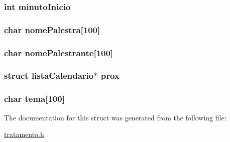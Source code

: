 \subsubsection[{minuto\+Inicio}]{\setlength{\rightskip}{0pt plus 5cm}int minuto\+Inicio}\label{structlista_calendario_a12abfd10f7bc791e8ec4f457078271c6}
\hypertarget{structlista_calendario_adc5cb057e15c10f55e77627c34ca1442}{}
\subsubsection[{nome\+Palestra}]{\setlength{\rightskip}{0pt plus 5cm}char nome\+Palestra\mbox{[}100\mbox{]}}\label{structlista_calendario_adc5cb057e15c10f55e77627c34ca1442}
\hypertarget{structlista_calendario_af31dd10e6cbda382c5fcb72a1d7e34ff}{}
\subsubsection[{nome\+Palestrante}]{\setlength{\rightskip}{0pt plus 5cm}char nome\+Palestrante\mbox{[}100\mbox{]}}\label{structlista_calendario_af31dd10e6cbda382c5fcb72a1d7e34ff}
\hypertarget{structlista_calendario_a1baa22779e03a190ac11515e1d0e7964}{}
\subsubsection[{prox}]{\setlength{\rightskip}{0pt plus 5cm}struct {\bf lista\+Calendario}$\ast$ prox}\label{structlista_calendario_a1baa22779e03a190ac11515e1d0e7964}
\hypertarget{structlista_calendario_a016fbc0f5fcc04c86b0e98087a05de7e}{}
\subsubsection[{tema}]{\setlength{\rightskip}{0pt plus 5cm}char tema\mbox{[}100\mbox{]}}\label{structlista_calendario_a016fbc0f5fcc04c86b0e98087a05de7e}


The documentation for this struct was generated from the following file\+:\begin{DoxyCompactItemize}
\item 
\hyperlink{tratamento_8h}{tratamento.\+h}\end{DoxyCompactItemize}

